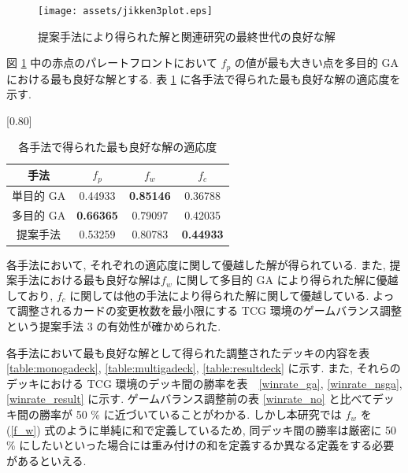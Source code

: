 \documentclass[12pt]{jarticle}
\begin{document}
\begin{figure}[t]
  \centering
  \texttt{[image: assets/jikken3plot.eps]}
  \vspace{-0.3cm}
  \caption{提案手法により得られた解と関連研究の最終世代の良好な解}
  \label{fig:jikken3plot}
\end{figure}
図 \ref{fig:jikken3plot} 中の赤点のパレートフロントにおいて $f_p$ の値が最も大きい点を多目的 GA における最も良好な解とする.
表 \ref{res_3} に各手法で得られた最も良好な解の適応度を示す.
\begin{table}[t]
  \centering
  \caption{各手法で得られた最も良好な解の適応度}
  \label{res_3}
  \vspace{-0.3cm}
  
  \scalebox{0.80}[0.80]{
    \begin{tabular}{|c|c|c|c|}
      \hline
      手法        & $f_p$ & $f_w$ & $f_c$ \\ \hline \hline
      単目的 GA      & 0.44933         & \textbf{0.85146}   & 0.36788          \\ \hline
      多目的 GA  & \textbf{0.66365}         & 0.79097   & 0.42035          \\ \hline
      提案手法   & 0.53259              &  0.80783     & \textbf{0.44933}  \\ \hline
      \end{tabular}
  }
  \vspace{-0.3cm}
  \end{table}
各手法において, それぞれの適応度に関して優越した解が得られている. また, 提案手法における最も良好な解は$f_w$ に関して多目的 GA により得られた解に優越しており, $f_c$ に関しては他の手法により得られた解に関して優越している. よって調整されるカードの変更枚数を最小限にする TCG 環境のゲームバランス調整という提案手法 3 の有効性が確かめられた.
\par
各手法において最も良好な解として得られた調整されたデッキの内容を表 \ref{table:monogadeck}, \ref{table:multigadeck}, \ref{table:resultdeck} に示す.
 また, それらのデッキにおける TCG 環境のデッキ間の勝率を表　\ref{winrate_ga}, \ref{winrate_nsga}, \ref{winrate_result} に示す. ゲームバランス調整前の表 \ref{winrate_no} と比べてデッキ間の勝率が 50 \% に近づいていることがわかる. しかし本研究では $f_w$ を (\ref{f_w}) 式のように単純に和で定義しているため, 同デッキ間の勝率は厳密に 50 \% にしたいといった場合には重み付けの和を定義するか異なる定義をする必要があるといえる.
\end{document}
